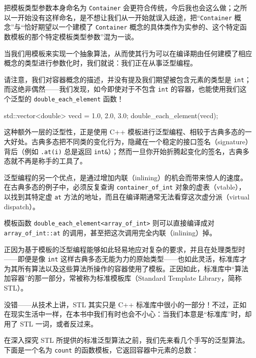 把模板类型参数本身命名为 \texttt{Container} 会更符合传统，今后我也会这么做；之所以一开始没有这样命名，是不想让我们从一开始就误入歧途，把“\texttt{Container} 概念”与“恰好期望以一个建模了 \texttt{Container} 概念的具体类作为实参的、这个特定函数模板的那个特定模板类型参数”混为一谈。

当我们用模板来实现一个抽象算法，从而使其行为可以在编译期由任何建模了相应概念的类型进行参数化时，我们就说：我们正在从事泛型编程。

请注意，我们对容器概念的描述，并没有提及我们期望被包含元素的类型是 \texttt{int}；而这绝非偶然——我们发现，如今即使对于不包含 \texttt{int} 的容器，也能使用我们这个泛型的 \texttt{double\_\allowbreak{}each\_\allowbreak{}element} 函数！

\begin{codebox}[cpp]
    std::vector<double> vecd = {1.0, 2.0, 3.0};
    double_each_element(vecd);
\end{codebox}

这种额外一层的泛型性，正是使用 C++ 模板进行泛型编程、相较于古典多态的一大好处。古典多态把不同类的变化行为，隐藏在一个稳定的接口签名（signature）背后（例如 \texttt{.at(\allowbreak{}i)\allowbreak{}} 总是返回 \texttt{int\&}）；然而一旦你开始折腾起变化的签名，古典多态就不再是称手的工具了。

泛型编程的另一个优点，是通过增加内联（inlining）的机会而带来惊人的速度。在古典多态的例子中，必须反复查询 \texttt{container\_\allowbreak{}of\_\allowbreak{}int} 对象的虚表（vtable），以找到其特定虚 \texttt{at} 方法的地址，而且在编译期通常无法看穿这次虚分派（virtual dispatch）。

模板函数 \texttt{double\_\allowbreak{}each\_\allowbreak{}element<\allowbreak{}array\_\allowbreak{}of\_\allowbreak{}int>\allowbreak{}} 则可以直接编译成对 \texttt{array\_\allowbreak{}of\_\allowbreak{}int::\allowbreak{}at} 的调用，甚至把这次调用完全内联（inlining）掉。

正因为基于模板的泛型编程能够如此轻易地应对复杂的要求，并且在处理类型时——即便是像 \texttt{int} 这样古典多态无能为力的原始类型——也如此灵活，标准库才为其所有算法以及这些算法所操作的容器使用了模板。正因如此，标准库中“算法加容器”的那一部分，常被称为标准模板库（Standard Template Library，简称 STL）。

没错——从技术上讲，STL 其实只是 C++ 标准库中很小的一部分！不过，正如在现实生活中一样，在本书中我们有时也会不小心：当我们本意是“标准库”时，却用了 STL 一词，或者反过来。

在深入探究 STL 所提供的标准泛型算法之前，我们先来看几个手写的泛型算法。下面是一个名为 \texttt{count} 的函数模板，它返回容器中元素的总数：

